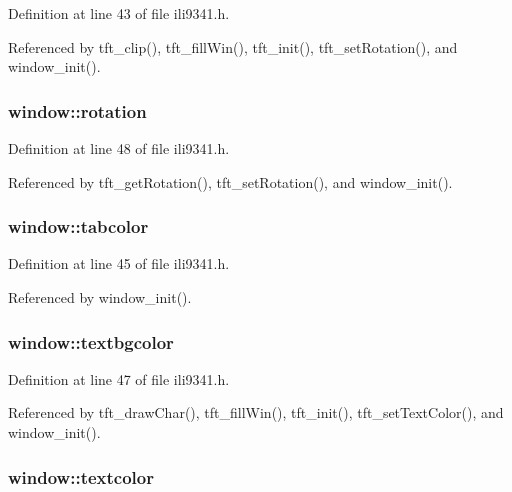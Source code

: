 Definition at line 43 of file ili9341.\-h.



Referenced by tft\-\_\-clip(), tft\-\_\-fill\-Win(), tft\-\_\-init(), tft\-\_\-set\-Rotation(), and window\-\_\-init().

\hypertarget{structwindow_afbd48ebcb41e68d0f458dac593578aa8}{
\subsubsection[{rotation}]{ window\-::rotation}}\label{structwindow_afbd48ebcb41e68d0f458dac593578aa8}


Definition at line 48 of file ili9341.\-h.



Referenced by tft\-\_\-get\-Rotation(), tft\-\_\-set\-Rotation(), and window\-\_\-init().

\hypertarget{structwindow_a8cf49b061febfaaaf9a52793e80d4796}{
\subsubsection[{tabcolor}]{ window\-::tabcolor}}\label{structwindow_a8cf49b061febfaaaf9a52793e80d4796}


Definition at line 45 of file ili9341.\-h.



Referenced by window\-\_\-init().

\hypertarget{structwindow_ae49a3c2629ffa093e60edc3f9e9e0917}{
\subsubsection[{textbgcolor}]{ window\-::textbgcolor}}\label{structwindow_ae49a3c2629ffa093e60edc3f9e9e0917}


Definition at line 47 of file ili9341.\-h.



Referenced by tft\-\_\-draw\-Char(), tft\-\_\-fill\-Win(), tft\-\_\-init(), tft\-\_\-set\-Text\-Color(), and window\-\_\-init().

\hypertarget{structwindow_aca878bb381210ef2ef8d764d08b126ae}{
\subsubsection[{textcolor}]{ window\-::textcolor}}\label{structwindow_aca878bb381210ef2ef8d764d08b126ae}


